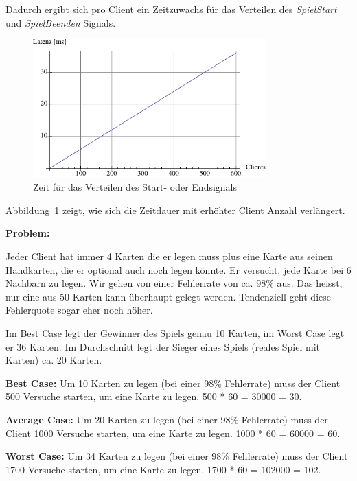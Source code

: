 Dadurch ergibt sich pro Client ein Zeitzuwachs für das Verteilen des \textit{SpielStart} und \textit{SpielBeenden} Signals.

\begin{figure}[hbt]
  \centering
  \includegraphics[width=0.8\textwidth,angle=0]{graphics/latency.pdf}
  \caption{Zeit für das Verteilen des Start- oder Endsignals \hfill{} }
  \label{ergebnislatency}
 \end{figure}
 
Abbildung~\ref{ergebnislatency} zeigt, wie sich die Zeitdauer mit erhöhter Client Anzahl verlängert.
 
\textbf{Problem:}

Jeder Client hat immer 4 Karten die er legen muss plus eine Karte aus seinen Handkarten, die er optional auch noch legen könnte. Er versucht, jede Karte bei 6 Nachbarn zu legen. Wir gehen von einer Fehlerrate von ca. 98\% aus. Das heisst, nur eine aus 50 Karten kann überhaupt gelegt werden. Tendenziell geht diese Fehlerquote sogar eher noch höher.

Im Best Case legt der Gewinner des Spiels genau 10 Karten, im Worst Case legt er 36 Karten. Im Durchschnitt legt der Sieger eines Spiels (reales Spiel mit Karten) ca. 20 Karten. 

\textbf{Best Case:} Um 10 Karten zu legen (bei einer 98\% Fehlerrate) muss der Client 500 Versuche starten, um eine Karte zu legen. \unit{500} * \unit{60}{\micro\second} = \unit{30000}{\micro\second} = \unit{30}{\milli\second}.

\textbf{Average Case:} Um 20 Karten zu legen (bei einer 98\% Fehlerrate) muss der Client 1000 Versuche starten, um eine Karte zu legen. \unit{1000} * \unit{60}{\micro\second} = \unit{60000}{\micro\second} = \unit{60}{\milli\second}.

\textbf{Worst Case:} Um 34 Karten zu legen (bei einer 98\% Fehlerrate) muss der Client 1700 Versuche starten, um eine Karte zu legen. \unit{1700} * \unit{60}{\micro\second} = \unit{102000}{\micro\second} = \unit{102}{\milli\second}.

